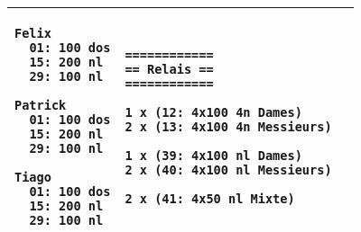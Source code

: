 \documentclass{article}
\begin{document}
{\begin{tabular}{|p{5cm}|p{5cm}|p{5cm}|}
\begin{verbatim}
Felix
  01: 100 dos
  15: 200 nl
  29: 100 nl

Patrick
  01: 100 dos
  15: 200 nl
  29: 100 nl

Tiago
  01: 100 dos
  15: 200 nl
  29: 100 nl
\end{verbatim}
&
\begin{verbatim}
============
== Relais ==
============

1 x (12: 4x100 4n Dames)
2 x (13: 4x100 4n Messieurs)

1 x (39: 4x100 nl Dames)
2 x (40: 4x100 nl Messieurs)

2 x (41: 4x50 nl Mixte)
\end{verbatim}\\
\hline
\end{tabular}}
\end{document}
